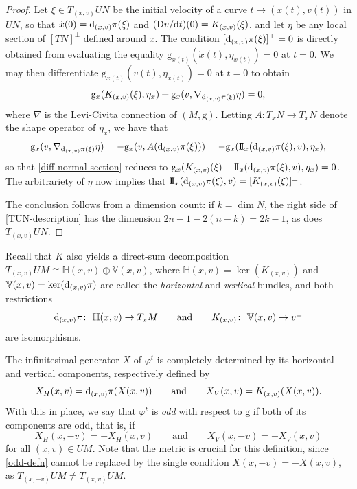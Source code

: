 \documentclass[10pt,a4paper]{amsart}
\newcommand{\g}{\mathrm{g}}
\numberwithin{equation}{section}
\theoremstyle{definition}
\begin{document}
\begin{proof}
 Let $\xi\in T_{(x,v)}UN$ be the initial velocity of a curve $t\mapsto (x(t),v(t))$ in $UN$, so that \mbox{$\dot{x}(0) = {\rm d}_{(x,v)}\pi(\xi)$} and $({\rm D}v/{\rm d}t)(0) = K_{(x,v)}(\xi)$, and let $\eta$ be any local section of $[TN]^\perp$ defined around $x$. The condition $[{\rm d}_{(x,v)}\pi(\xi)]^\perp= 0$ is directly obtained from evaluating the equality $\g_{x(t)}(\dot{x}(t), \eta_{x(t)}) = 0$ at $t=0$. We may then differentiate $\g_{x(t)}(v(t), \eta_{x(t)})=0$ at $t=0$ to obtain \begin{equation}\label{diff-normal-section}\g_x(K_{(x,v)}(\xi), \eta_x) + \g_x(v, \nabla_{{\rm d}_{(x,v)}\pi(\xi)}\eta)=0,\end{equation}where $\nabla$ is the Levi-Civita connection of $(M,\g)$. Letting $A\colon T_xN\to T_xN$ denote the shape operator of $\eta_x$, we have that \begin{equation*}
 \g_x(v, \nabla_{{\rm d}_{(x,v)}\pi(\xi)}\eta) = -\g_x(v, A({\rm d}_{(x,v)}\pi(\xi))) = -\g_x( {\rm I\!I}_x({\rm d}_{(x,v)}\pi(\xi) ,v), \eta_x),
 \end{equation*}so that \eqref{diff-normal-section} reduces to $\g_x(K_{(x,v)}(\xi) - {\rm I\!I}_x({\rm d}_{(x,v)}\pi(\xi) ,v),\eta_x ) = 0$. The arbitrariety of $\eta$ now implies that ${\rm I\!I}_x({\rm d}_{(x,v)}\pi(\xi), v) = [K_{(x,v)}(\xi)]^\perp$.

 The conclusion follows from a dimension count: if $k=\dim N$, the right side of \eqref{TUN-description} has the dimension $2n-1-2(n-k) = 2k-1$, as does $T_{(x,v)}UN$. \end{proof}

Recall that $K$ also yields a direct-sum decomposition $T_{(x,v)}UM \cong \mathbb{H}(x,v) \oplus \mathbb{V}(x,v)$, where $\mathbb{H}(x,v) = \ker(K_{(x,v)})$ and $\mathbb{V}(x,v) = \ker({\rm d}_{(x,v)}\pi)$ are called the \emph{horizontal} and \emph{vertical} bundles, and both restrictions
\begin{equation}\label{dpi-K-isomorphisms}
{\rm d}_{(x,v)}\pi \colon \ \mathbb{H}(x,v) \rightarrow T_xM\qquad\mbox{and}\qquad K_{(x,v)} \colon \ \mathbb{V}(x,v) \rightarrow v^\perp
\end{equation}are isomorphisms.

The infinitesimal generator $X$ of $\varphi^t$ is completely determined by its horizontal and vertical components, respectively defined by \begin{equation}\label{hor-ver-comps} X_H(x,v) = {\rm d}_{(x,v)}\pi(X(x,v))\qquad\mbox{and} \qquad X_V(x,v) = K_{(x,v)}(X(x,v)).\end{equation} With this in place, we say that $\varphi^t$ is \emph{odd} with respect to $\g$ if both of its components are odd, that is, if
\begin{equation}\label{odd-defn} X_H(x,-v) = - X_H(x,v) \qquad\text{and}\qquad X_V(x,-v) = -X_V(x,v)\end{equation}for all $(x,v)\in UM$. Note that the metric is crucial for this definition, since \eqref{odd-defn} cannot be replaced by the single condition $X(x,-v) = -X(x,v)$, as $T_{(x,-v)}UM \neq T_{(x,v)}UM$.
\end{document}
